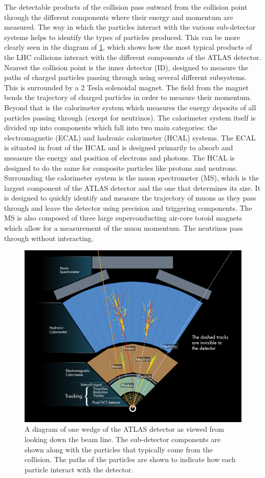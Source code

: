 The detectable products of the collision pass outward from the collision
point through the different components where their energy and momentum
are measured. The way in which the particles interact with the various
sub-detector systems helps to identify the types of 
particles produced.
This can be more clearly seen in the diagram of 
\fig\ref{fig:atlas_wedge}, which shows how the most typical
products of the LHC collisions interact with the different
components of the ATLAS detector.
Nearest the collision point is the inner detector (ID), designed to 
measure the paths of charged particles passing through using several
different subsystems. This 
is surrounded by a 2 Tesla solenoidal magnet.
The field from the magnet bends the trajectory of charged particles
in order to measure their momentum.
Beyond that is the calorimeter system
which measures the energy deposits of all particles passing 
through (except for neutrinos). The calorimeter system 
itself is divided up into components which fall into two main 
categories: the electromagnetic (ECAL)
and hadronic calorimeter (HCAL) systems.
The ECAL is situated in front of the HCAL and is designed
primarily to absorb and mesasure the energy and position of
electrons and photons. 
The HCAL is designed to do the same for
composite particles like protons and neutrons.
Surrounding the calorimeter system is the muon spectrometer (MS),
which is the largest component of the ATLAS detector and the one
that determines its size. It is designed to quickly identify and measure the 
trajectory of muons as they pass through
and leave the detector using precision 
and triggering components. The MS is also composed of 
three large superconducting air-core toroid magnets 
which allow for
a measurement of the muon momentum. The neutrinos 
pass through without interacting.

\begin{figure}[ht!]
\centering
\includegraphics[width=.9\textwidth]{figures/atlas/wedge.jpg}
\caption{A diagram of one wedge of the ATLAS detector
as viewed from looking down the beam line. 
The sub-detector components are shown along with the 
particles that typically come from the collision.
The paths of the particles are shown to indicate how each particle 
interact with the detector.}
\label{fig:atlas_wedge}
\end{figure}

